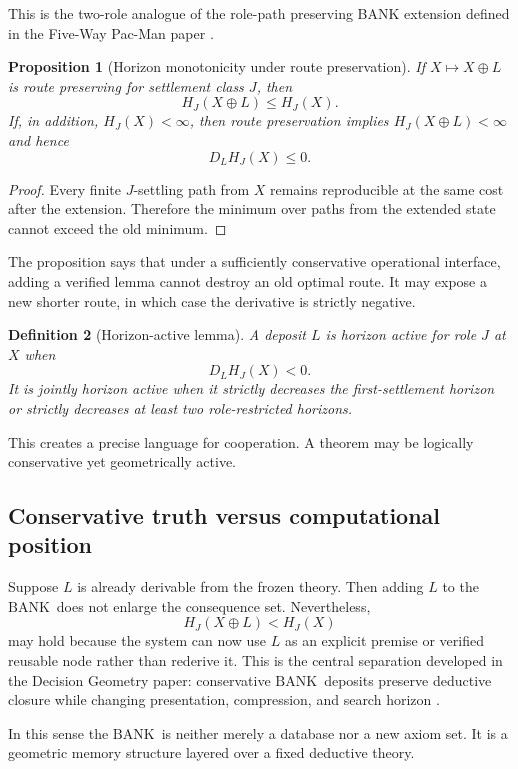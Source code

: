 \documentclass[11pt]{article}
\newtheorem{definition}{Definition}[section]
\newtheorem{proposition}[definition]{Proposition}
\theoremstyle{remark}
\newcommand{\BANK}{\ensuremath{\mathrm{BANK}}}
\begin{document}
This is the two-role analogue of the role-path preserving BANK extension defined in the Five-Way Pac-Man paper \cite{TennesonPacMan}.

\begin{proposition}[Horizon monotonicity under route preservation]
If $X\mapsto X\oplus L$ is route preserving for settlement class $J$, then
\[
H_J(X\oplus L)\le H_J(X).
\]
If, in addition, $H_J(X)<\infty$, then route preservation implies $H_J(X\oplus L)<\infty$ and hence
\[
D_LH_J(X)\le 0.
\]
\end{proposition}

\begin{proof}
Every finite $J$-settling path from $X$ remains reproducible at the same cost after the extension. Therefore the minimum over paths from the extended state cannot exceed the old minimum.
\end{proof}

The proposition says that under a sufficiently conservative operational interface, adding a verified lemma cannot destroy an old optimal route. It may expose a new shorter route, in which case the derivative is strictly negative.

\begin{definition}[Horizon-active lemma]
A deposit $L$ is horizon active for role $J$ at $X$ when
\[
D_LH_J(X)<0.
\]
It is jointly horizon active when it strictly decreases the first-settlement horizon or strictly decreases at least two role-restricted horizons.
\end{definition}

This creates a precise language for cooperation. A theorem may be logically conservative yet geometrically active.

\subsection{Conservative truth versus computational position}

Suppose $L$ is already derivable from the frozen theory. Then adding $L$ to the \BANK\ does not enlarge the consequence set. Nevertheless,
\[
H_J(X\oplus L)<H_J(X)
\]
may hold because the system can now use $L$ as an explicit premise or verified reusable node rather than rederive it. This is the central separation developed in the Decision Geometry paper: conservative \BANK\ deposits preserve deductive closure while changing presentation, compression, and search horizon \cite{TennesonAMLDII}.

In this sense the \BANK\ is neither merely a database nor a new axiom set. It is a geometric memory structure layered over a fixed deductive theory.
\end{document}

